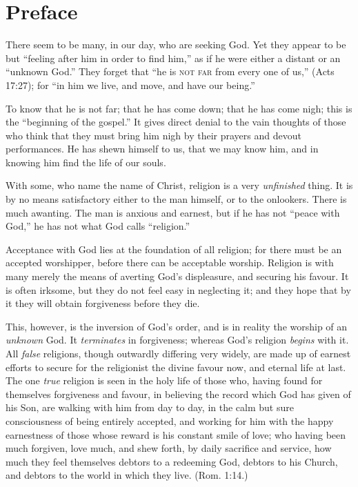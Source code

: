 \documentclass[
]{book}
\begin{document}
\clearpage
\setcounter{page}{1}

\hypertarget{preface}{%
\chapter*{Preface}\label{preface}}

There seem to be many, in our day, who are seeking God. Yet they appear to be but ``feeling after him in order to find him,'' as if he were either a distant or an ``unknown God.'' They forget that ``he is \textsc{not far} from every one of us,'' (Acts 17:27); for ``in him we live, and move, and have our being.''

To know that he is not far; that he has come down; that he has come nigh; this is the ``beginning of the gospel.'' It gives direct denial to the vain thoughts of those who think that they must bring him nigh by their prayers and devout performances. He has shewn himself to us, that we may know him, and in knowing him find the life of our souls.

With some, who name the name of Christ, religion is a very \emph{unfinished} thing. It is by no means satisfactory either to the man himself, or to the onlookers. There is much awanting. The man is anxious and earnest, but if he has not ``peace with God,'' he has not what God calls ``religion.''

Acceptance with God lies at the foundation of all religion; for there must be an accepted worshipper, before there can be acceptable worship. Religion is with many merely the means of averting God's displeasure, and securing his favour. It is often irksome, but they do not feel easy in neglecting it; and they hope that by it they will obtain forgiveness before they die.

This, however, is the inversion of God's order, and is in reality the worship of an \emph{unknown} God. It \emph{terminates} in forgiveness; whereas God's religion \emph{begins} with it. All \emph{false} religions, though outwardly differing very widely, are made up of earnest efforts to secure for the religionist the divine favour now, and eternal life at last. The one \emph{true} religion is seen in the holy life of those who, having found for themselves forgiveness and favour, in believing the record which God has given of his Son, are walking with him from day to day, in the calm but sure consciousness of being entirely accepted, and working for him with the happy earnestness of those whose reward is his constant smile of love; who having been much forgiven, love much, and shew forth, by daily sacrifice and service, how much they feel themselves debtors to a redeeming God, debtors to his Church, and debtors to the world in which they live. (Rom. 1:14.)
\end{document}
